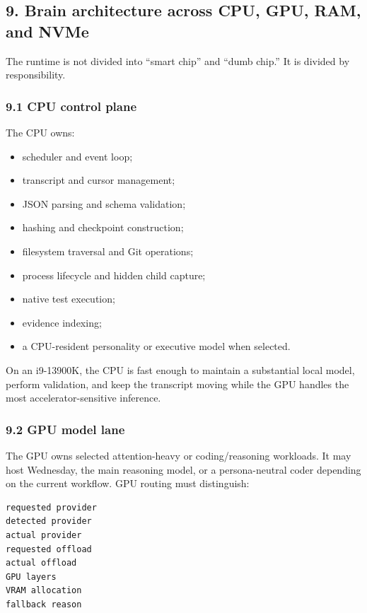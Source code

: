 \subsection{9. Brain architecture across CPU, GPU, RAM, and NVMe}

The runtime is not divided into ``smart chip'' and ``dumb chip.'' It is divided by
responsibility.

\subsubsection{9.1 CPU control plane}

The CPU owns:

\begin{itemize}
\item
  scheduler and event loop;
\item
  transcript and cursor management;
\item
  JSON parsing and schema validation;
\item
  hashing and checkpoint construction;
\item
  filesystem traversal and Git operations;
\item
  process lifecycle and hidden child capture;
\item
  native test execution;
\item
  evidence indexing;
\item
  a CPU-resident personality or executive model when selected.
\end{itemize}

On an i9-13900K, the CPU is fast enough to maintain a substantial local model,
perform validation, and keep the transcript moving while the GPU handles the
most accelerator-sensitive inference.

\subsubsection{9.2 GPU model lane}

The GPU owns selected attention-heavy or coding/reasoning workloads. It may host
Wednesday, the main reasoning model, or a persona-neutral coder depending on
the current workflow. GPU routing must distinguish:

\begin{verbatim}
requested provider
detected provider
actual provider
requested offload
actual offload
GPU layers
VRAM allocation
fallback reason
\end{verbatim}

